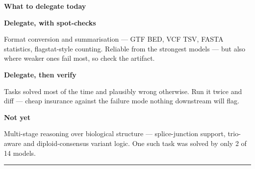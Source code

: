 \documentclass[final]{article}
\newcommand{\sz}[2]{\fontsize{#1}{#2}\selectfont}
\newcommand{\body}{\sz{21}{29}}
\newcommand{\arr}{\,\textrightarrow\,}
\begin{document}
\begin{tcolorbox}[card, left=14mm, right=14mm, top=11mm, bottom=11mm]
  {\dsp\bfseries\sz{35}{43}\color{btink}What to delegate today\par}
  \vspace{8mm}

  \newcommand{\adv}[3]{%
    \begin{minipage}[t]{0.288\linewidth}\vspace{0pt}\raggedright
      {\dsp\bfseries\sz{25}{32}\color{#1}#2\par}\vspace{4mm}
      {\body\color{btink}#3\par}
    \end{minipage}}

  \adv{btblue}{Delegate, with spot-checks}{Format conversion and summarisation
    --- GTF\arr BED, VCF\arr TSV, FASTA statistics, flagstat-style counting.
    Reliable from the strongest models --- but also where weaker ones fail
    most, so check the artifact.}\hfill
  \adv{btviolet}{Delegate, then verify}{Tasks solved most of the time and
    plausibly wrong otherwise. Run it twice and diff --- cheap insurance
    against the failure mode nothing downstream will flag.}\hfill
  \adv{btorange}{Not yet}{Multi-stage reasoning over biological structure ---
    splice-junction support, trio-aware and diploid-consensus variant logic.
    One such task was solved by only 2 of 14 models.}

  \vspace{9mm}
  {\color{btrule}\rule{\linewidth}{0.8mm}}\\[8mm]


\end{tcolorbox}
\end{document}
